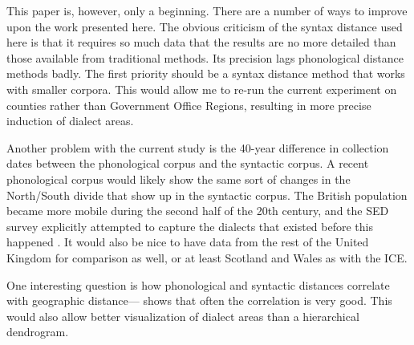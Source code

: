 \documentclass[11pt]{article}
\begin{document}
This paper is, however, only a beginning. There are a number of ways to
improve upon the work presented here. The obvious criticism of the
syntax distance used here is that it requires so much data that the
results are no more detailed than those available from traditional
methods. Its precision lags phonological distance methods badly. The
first priority should be a syntax distance method that works with
smaller corpora. This would allow me to re-run the current experiment
on counties rather than Government Office Regions, resulting in more
precise induction of dialect areas.

Another problem with the current study is the 40-year difference in
collection dates between the phonological corpus and the syntactic
corpus. A recent phonological corpus would likely show the same sort
of changes in the North/South divide that show up in the syntactic
corpus. The British population became more mobile during the second
half of the 20th century, and the SED survey explicitly attempted to capture
the dialects that existed before this happened \cite{orton78}.
It would also be nice to have data from the rest of the United Kingdom for
comparison as well, or at least Scotland and Wales as with the ICE.


One interesting question is
how phonological and syntactic distances correlate with geographic
distance--- shows that often the correlation is
very good. This would also allow better visualization of dialect areas
than a hierarchical dendrogram.



\end{document}
